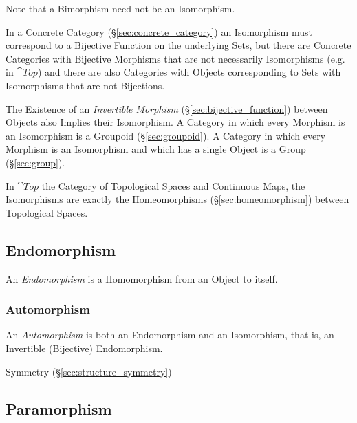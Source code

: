 \HandRight\; Note that a Bimorphism need not be an Isomorphism.

In a Concrete Category (\S\ref{sec:concrete_category}) an Isomorphism
must correspond to a Bijective Function on the underlying Sets, but
there are Concrete Categories with Bijective Morphisms that are not
necessarily Isomorphisms (e.g. in $\cat{Top}$) and there are also
Categories with Objects corresponding to Sets with Isomorphisms that
are not Bijections.

The Existence of an \emph{Invertible Morphism}
(\S\ref{sec:bijective_function}) between Objects also Implies their
Isomorphism. A Category in which every Morphism is an Isomorphism is a
Groupoid (\S\ref{sec:groupoid}). A Category in which every Morphism is
an Isomorphism and which has a single Object is a Group
(\S\ref{sec:group}).

In $\cat{Top}$ the Category of Topological Spaces and Continuous
Maps, the Isomorphisms are exactly the Homeomorphisms
(\S\ref{sec:homeomorphism}) between Topological Spaces.



\subsection{Endomorphism}\label{sec:endomorphism}

An \emph{Endomorphism} is a Homomorphism from an Object to itself.



\subsubsection{Automorphism}\label{sec:automorphism}

An \emph{Automorphism} is both an Endomorphism and an Isomorphism,
that is, an Invertible (Bijective) Endomorphism.

Symmetry (\S\ref{sec:structure_symmetry})



\subsection{Paramorphism}\label{sec:paramorphism}

